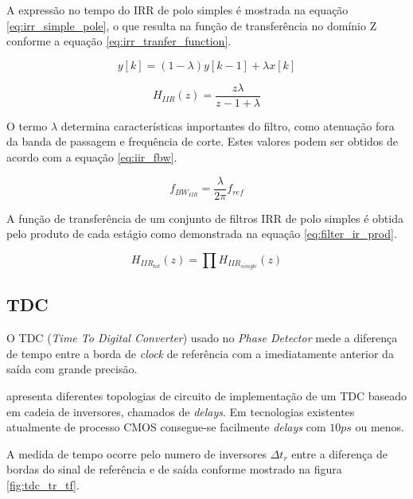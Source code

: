 A expressão no tempo do IRR de polo simples é mostrada na equação \ref{eq:irr_simple_pole}, o que resulta na função de transferência no domínio Z conforme a equação \ref{eq:irr_tranfer_function}.

 \begin{equation}
	y[k]= (1 - \lambda) y[k-1] + \lambda x[k]
	\label{eq:irr_simple_pole}
\end{equation}

 \begin{equation}
	H_{IIR}(z)= \frac{z \lambda}{z -1 + \lambda}
	\label{eq:irr_tranfer_function}
\end{equation}


O termo $\lambda$ determina características importantes do filtro, como atenuação fora da banda de passagem e frequência de corte. Estes valores podem ser obtidos de acordo com a equação \ref{eq:iir_fbw}.


 \begin{equation}
	f_{BW_{IIR}}= \frac{\lambda}{2 \pi} f_{ref}
	\label{eq:iir_fbw}
\end{equation}

A função de transferência de um conjunto de filtros IRR de polo simples é obtida pelo produto de cada estágio como demonstrada na equação \ref{eq:filter_ir_prod}.

 \begin{equation}
	H_{IIR_{tot}}(z)= \prod 	H_{IIR_{simgle}}(z)
	\label{eq:filter_ir_prod}
\end{equation}

\subsection{TDC}

O TDC (\textit{Time To Digital Converter}) usado no \textit{Phase Detector} mede a diferença de tempo entre a borda de \textit{clock} de referência com a imediatamente anterior da saída com grande precisão. 

\cite{ferreira2020review} apresenta diferentes topologias de circuito de implementação de um TDC baseado em cadeia de inversores, chamados de \textit{delays}. Em tecnologias existentes atualmente de processo CMOS consegue-se facilmente \textit{delays} com $10 ps$ ou menos.

A medida de tempo ocorre pelo numero de inversores $\Delta t_r$ entre a diferença de bordas do sinal de referência e de saída conforme mostrado na figura \ref{fig:tdc_tr_tf}.

